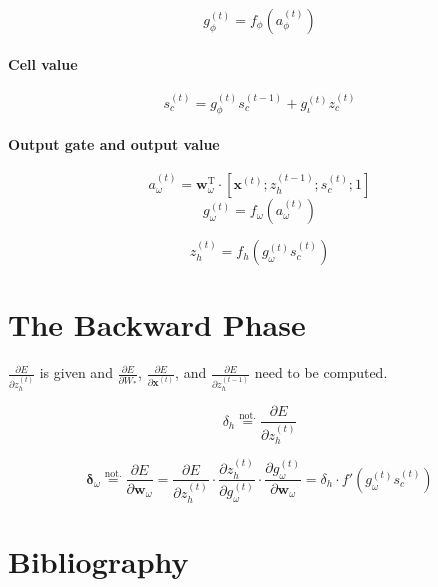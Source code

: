 \documentclass[11pt]{article}
\begin{document}
$$g_{\phi}^{(t)} = f_{\phi}\left(a_{\phi}^{(t)}\right)$$

\paragraph{Cell value}

$$s_c^{(t)} = g_{\phi}^{(t)} s_c^{(t-1)} + g_{\iota}^{(t)} z_{c}^{(t)}$$

\paragraph{Output gate and output value}

$$a_{\omega}^{(t)} = \mathbf{w}_{\omega}^{\text{T}} \cdot \left[\mathbf{x}^{(t)}; z_{h}^{(t-1)}; s_c^{(t)}; 1\right]$$
$$g_{\omega}^{(t)} = f_{\omega}\left(a_{\omega}^{(t)}\right)$$

$$z_h^{(t)} = f_h\left(g_{\omega}^{(t)} s_c^{(t)}\right)$$

\section{The Backward Phase}

$\displaystyle\frac{\partial E}{\partial z_h^{(t)}}$ is given and $\displaystyle \frac{\partial E}{\partial W_{*}}$, $\displaystyle \frac{\partial E}{\partial \mathbf{x}^{(t)}}$, and $\displaystyle \frac{\partial E}{\partial z_{h}^{(t-1)}}$ need to be computed.

$$\delta_{h} \overset{\text{not.}}{=} \displaystyle \frac{\partial E}{\partial z_h^{(t)}}$$

$$\boldsymbol{\delta}_{\omega} \overset{\text{not.}}{=} \displaystyle \frac{\partial E}{\partial \mathbf{w}_{\omega}} = \displaystyle \frac{\partial E}{\partial z_h^{(t)}} \cdot \displaystyle \frac{\partial z_h^{(t)}}{\partial g_{\omega}^{(t)}} \cdot \displaystyle \frac{\partial g_{\omega}^{(t)}}{\partial \mathbf{w}_{\omega}} = \delta_h \cdot f'(g_{\omega}^{(t)} s_c^{(t)}) $$

\appendix
\section{Bibliography}
\end{document}
